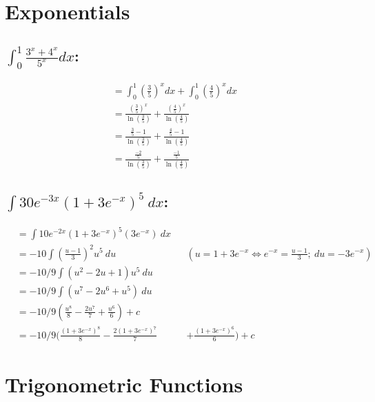 \documentclass[MathsNotesBase.tex]{subfiles}
\begin{document}
\bigskip
\bigskip
\bigskip
\bigskip


\section*{Exponentials}
\bigskip

  \subsection*{$\int_0^1{\frac{3^x + 4^x}{5^x}}dx$:}
  \begin{align*}
      &= \int_0^1{{\left(\frac{3}{5}\right)}^x}dx +         \int_0^1{{\left(\frac{4}{5}\right)}^x}dx && \\[8pt]
      &= \frac{{\left(\frac{3}{5}\right)}^x}{\ln(\frac{3}{5})} + \frac{{\left(\frac{4}{5}\right)}^x}{\ln(\frac{4}{5})} \\[8pt]
      &= \frac{\frac{3}{5} - 1}{\ln(\frac{3}{5})} +
      \frac{\frac{4}{5} - 1}{\ln(\frac{4}{5})} \\[8pt]
      &= \frac{\frac{-2}{5}}{\ln(\frac{3}{5})} +
      \frac{\frac{-1}{5}}{\ln(\frac{4}{5})}
  \end{align*}
  
  \subsection*{$\int{30e^{-3x}{\left(1 + 3e^{-x}\right)}^5}\ dx$:}
  \begin{align*}
      &= \int{10e^{-2x}{\left(1 + 3e^{-x}\right)^5}(3e^{-x})}\ dx && \\[8pt]
      &= -10\int{\left(\frac{u - 1}{3}\right)^2{u^5}}\ du && \left(u = 1 + 3e^{-x} \iff e^{-x} = \frac{u - 1}{3};\ du = -3e^{-x}\right) \\[8pt]
      &= -10/9\int{\left(u^2 - 2u + 1\right){u^5}}\ du && \\[8pt]
      &= -10/9\int{\left(u^7 - 2u^6 + u^5\right)}\ du && \\[8pt]
      &= -10/9\left(\frac{u^8}{8} - \frac{2u^7}{7} + \frac{u^6}{6}\right) + c && \\[8pt]
      &= -10/9\biggl(\frac{(1 + 3e^{-x})^8}{8} - \frac{2(1 + 3e^{-x})^7}{7}&& + \frac{(1 + 3e^{-x})^6}{6}\biggr) + c
  \end{align*}


\bigskip
\bigskip
\bigskip
\bigskip



\section*{Trigonometric Functions}
\bigskip
\end{document}
